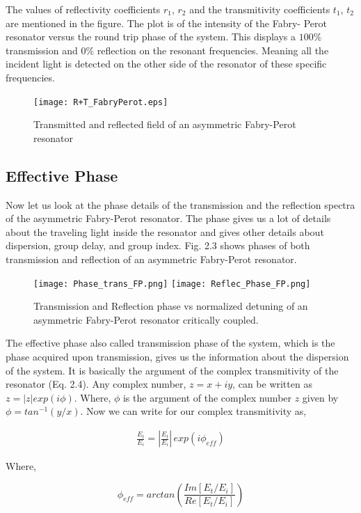 The values of reflectivity coefficients $r_{1}$, $r_{2}$ and the transmitivity coefficients $t_{1}$, $t_{2}$ are mentioned in the figure. The plot is of the intensity of the Fabry- Perot resonator versus the round trip phase of the system. This displays a $100\%$ transmission and $0\%$ reflection on the resonant frequencies. Meaning all the incident light is detected on the other side of the resonator of these specific frequencies. 

\begin{figure}[h]
\centering
\texttt{[image: R+T\_FabryPerot.eps]}
\caption{Transmitted and reflected field of an asymmetric Fabry-Perot resonator}
\end{figure}


\subsection{Effective Phase}
Now let us look at the phase details of the transmission and the reflection spectra of the asymmetric Fabry-Perot resonator. The phase gives us a lot of details about the traveling light inside the resonator and gives other details about dispersion, group delay, and group index. Fig. 2.3 shows phases of both transmission and reflection of an asymmetric Fabry-Perot resonator.

\begin{figure}[h]
\texttt{[image: Phase\_trans\_FP.png]}
\texttt{[image: Reflec\_Phase\_FP.png]}
\caption{Transmission and Reflection phase vs normalized detuning of an asymmetric Fabry-Perot resonator critically coupled.}
\end{figure}

The effective phase also called transmission phase of the system, which is the phase acquired upon transmission, gives us the information about the dispersion of the system. It is basically the argument of the complex transmitivity of the resonator (Eq. 2.4). Any complex number, $z = x + iy$, can be written as $z = |z|exp(i\phi)$. Where, $\phi$ is the argument of the complex number $z$ given by $\phi = tan^{-1}(y/x)$. Now we can write for our complex transmitivity as,

\begin{align*}
\frac{E_{t}}{E_{i}} = |\frac{E_{t}}{E_{i}}|\,exp(i\phi_{eff})
\end{align*} 

Where,

\begin{equation}
\phi_{eff} = arctan(\frac{Im[E_{t}/E_{i}]}{Re[E_{t}/E_{i}]})
\end{equation}

